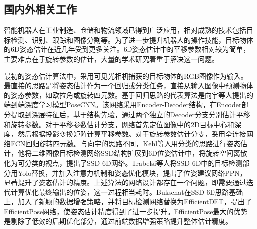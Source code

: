 \documentclass[12pt]{article}
\newcommand{\note}[1]{\textcolor[rgb]{0.6,0,0}{note: #1}}
\begin{document}


\subsection{国内外相关工作}


智能机器人在工业制造、仓储和物流领域已得到广泛应用，相对成熟的技术包括目标检测、识别、跟踪和图像分割等。为了进一步提升机器人的操作技能，目标物体的6D姿态估计在近几年受到更多关注。6D姿态估计中的平移参数相对较为简单，主要难点在于旋转参数的估计，大量的学术研究着重于解决这一问题。

最初的姿态估计算法中，采用可见光相机捕获的目标物体的RGB图像作为输入。最直接的思路是将姿态估计作为一个回归或分类任务，直接从输入图像中预测物体的姿态参数，如欧拉角或旋转四元数。基于回归思路的代表算法是向宇等人提出的端到端深度学习模型PoseCNN\cite{Xiang2018}。该网络采用Encoder-Decoder结构，在Encoder部分提取到深层特征后，基于结构先验，通过两个独立的Decoder分支分别估计平移和旋转参数。对于平移参数估计分支，网络首先定位图像中的2D目标中心和深度，然后根据投影变换矩阵计算平移参数。对于旋转参数估计分支，采用全连接网络FCN回归旋转四元数。与向宇的思路不同，Kehl等人用分类的思路进行姿态估计，他将二维图像目标检测网络SSD\cite{liu2016ssd}结构扩展到6D位姿估计中，将旋转空间离散化为可分类的视点，提出了SSD-6D\cite{kehl2017ssd}网络。Trabelsi等人将SSD-6D中的目标检测部分用Yolo替换，并加入注意力机制和姿态优化模块，提出了位姿建议网络PPN\cite{trabelsi2021pose}，显著提升了姿态估计的精度。上述算法的网络设计都存在一个问题，即需要通过迭代计算优化最终输出的位姿，这一过程相当耗时。Bukschat在SSD-6D思路基础上，加入了新颖的数据增强策略，并将目标检测网络替换为EfficientDET\cite{tan2020efficientdet}，提出了EfficientPose\cite{bukschat2020efficientpose}网络，使姿态估计精度得到了进一步提升。EfficientPose最大的优势是剔除了低效的后期优化部分，通过前端数据增强策略提升整体估计精度。
\end{document}
